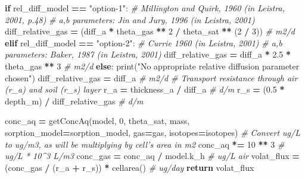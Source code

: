 \documentclass[]{article}
\newenvironment{Shaded}{\begin{snugshade}}{\end{snugshade}}
\newcommand{\DecValTok}[1]{\textcolor[rgb]{0.00,0.00,0.81}{{#1}}}
\newcommand{\FloatTok}[1]{\textcolor[rgb]{0.00,0.00,0.81}{{#1}}}
\newcommand{\StringTok}[1]{\textcolor[rgb]{0.31,0.60,0.02}{{#1}}}
\newcommand{\CommentTok}[1]{\textcolor[rgb]{0.56,0.35,0.01}{\textit{{#1}}}}
\newcommand{\ControlFlowTok}[1]{\textcolor[rgb]{0.13,0.29,0.53}{\textbf{{#1}}}}
\newcommand{\OperatorTok}[1]{\textcolor[rgb]{0.81,0.36,0.00}{\textbf{{#1}}}}
\newcommand{\BuiltInTok}[1]{{#1}}
\newcommand{\NormalTok}[1]{{#1}}
\begin{document}
\begin{Shaded}
\begin{Highlighting}[]
    \ControlFlowTok{if} \NormalTok{rel_diff_model }\OperatorTok{==} \StringTok{"option-1"}\NormalTok{:}
        \CommentTok{# Millington and Quirk, 1960 (in Leistra, 2001, p.48)}
        \CommentTok{# a,b parameters: Jin and Jury, 1996 (in Leistra, 2001)}
        \NormalTok{diff_relative_gas }\OperatorTok{=} \NormalTok{(diff_a }\OperatorTok{*} \NormalTok{theta_gas }\OperatorTok{**} \DecValTok{2} \OperatorTok{/}
                             \NormalTok{theta_sat }\OperatorTok{**} \NormalTok{(}\DecValTok{2} \OperatorTok{/} \DecValTok{3}\NormalTok{))  }\CommentTok{# m2/d}
    \ControlFlowTok{elif} \NormalTok{rel_diff_model }\OperatorTok{==} \StringTok{"option-2"}\NormalTok{:}
        \CommentTok{# Currie 1960 (in Leistra, 2001)}
        \CommentTok{# a,b parameters: Baker, 1987 (in Leistra, 2001)}
        \NormalTok{diff_relative_gas }\OperatorTok{=} \NormalTok{diff_a }\OperatorTok{*} \FloatTok{2.5} \OperatorTok{*} \NormalTok{theta_gas }\OperatorTok{**} \DecValTok{3}  \CommentTok{# m2/d}
    \ControlFlowTok{else}\NormalTok{:}
        \BuiltInTok{print}\NormalTok{(}\StringTok{"No appropriate relative diffusion parameter chosen"}\NormalTok{)}
        \NormalTok{diff_relative_gas }\OperatorTok{=} \NormalTok{diff_a  }\CommentTok{# m2/d}
    \CommentTok{# Transport resistance through air (r_a) and soil (r_s) layer}
    \NormalTok{r_a }\OperatorTok{=} \NormalTok{thickness_a }\OperatorTok{/} \NormalTok{diff_a  }\CommentTok{# d/m}
    \NormalTok{r_s }\OperatorTok{=} \NormalTok{(}\FloatTok{0.5} \OperatorTok{*} \NormalTok{depth_m) }\OperatorTok{/} \NormalTok{diff_relative_gas  }\CommentTok{# d/m}

    \NormalTok{conc_aq }\OperatorTok{=} \NormalTok{getConcAq(model, }\DecValTok{0}\NormalTok{, theta_sat, mass,}
                        \NormalTok{sorption_model}\OperatorTok{=}\NormalTok{sorption_model, gas}\OperatorTok{=}\NormalTok{gas, isotopes}\OperatorTok{=}\NormalTok{isotopes)}
    \CommentTok{# Convert ug/L to ug/m3, as will be multiplying by cell's area in m2}
    \NormalTok{conc_aq }\OperatorTok{*=} \DecValTok{10} \OperatorTok{**} \DecValTok{3}  \CommentTok{# ug/L * 10^3 L/m3}
    \NormalTok{conc_gas }\OperatorTok{=} \NormalTok{conc_aq }\OperatorTok{/} \NormalTok{model.k_h  }\CommentTok{# ug/L air}
    \NormalTok{volat_flux }\OperatorTok{=} \NormalTok{(conc_gas }\OperatorTok{/} \NormalTok{(r_a }\OperatorTok{+} \NormalTok{r_s)) }\OperatorTok{*} \NormalTok{cellarea()  }\CommentTok{# ug/day}
    \ControlFlowTok{return} \NormalTok{volat_flux}
\end{Highlighting}
\end{Shaded}
\end{document}
